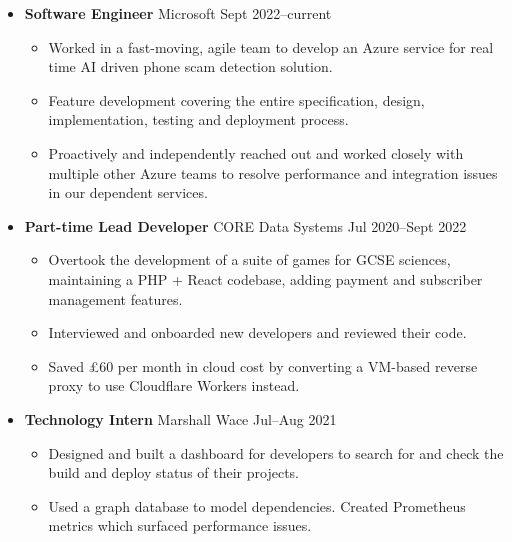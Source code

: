   \begin{itemize}
    \item \textbf{Software Engineer} %
    \dashdiv{} Microsoft \dashdiv{} Sept 2022--current

    \begin{itemize}
      \item Worked in a fast-moving, agile team to develop an Azure service for real time AI driven phone scam detection solution.
      \item Feature development covering the entire specification, design, implementation, testing and deployment process.
      \item Proactively and independently reached out and worked closely with multiple other Azure teams to resolve performance and integration issues in our dependent services.
    \end{itemize}

    \item \textbf{Part-time Lead Developer} \dashdiv{} CORE Data Systems \dashdiv{} Jul 2020--Sept 2022

    \begin{itemize}
      \item Overtook the development of a suite of games for GCSE sciences, maintaining a PHP + React codebase, adding payment and subscriber management features.
      \item Interviewed and onboarded new developers and reviewed their code.
      \item Saved £60 per month in cloud cost by converting a VM-based reverse proxy to use Cloudflare Workers instead.
    \end{itemize}

    \item \textbf{Technology Intern} \dashdiv{} Marshall Wace \dashdiv{} Jul--Aug 2021

    \begin{itemize}
      \item Designed and built a dashboard for developers to search for and check the build and deploy status of their projects.
      \item Used a graph database to model dependencies. Created Prometheus metrics which surfaced performance issues.
    \end{itemize}

  \end{itemize}

